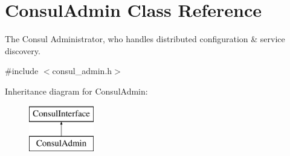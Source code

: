 \hypertarget{classConsulAdmin}{\section{Consul\-Admin Class Reference}
\label{classConsulAdmin}
}


The Consul Administrator, who handles distributed configuration \& service discovery.  




{\ttfamily \#include $<$consul\-\_\-admin.\-h$>$}

Inheritance diagram for Consul\-Admin\-:\begin{figure}[H]
\begin{center}
\leavevmode
\includegraphics[height=2.000000cm]{classConsulAdmin}
\end{center}
\end{figure}
